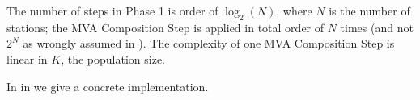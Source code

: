 The number of steps in Phase 1 is order of
$\log_2(N)$, where $N$ is the number of stations;
the MVA Composition Step is applied in total
order of $N$ times (and not $2^N$ as wrongly
assumed in \cite{balsamo2000product}). The
complexity of one MVA Composition Step is linear
in $K$, the population size.

In  in
 we give a
concrete implementation.

%
%

%

